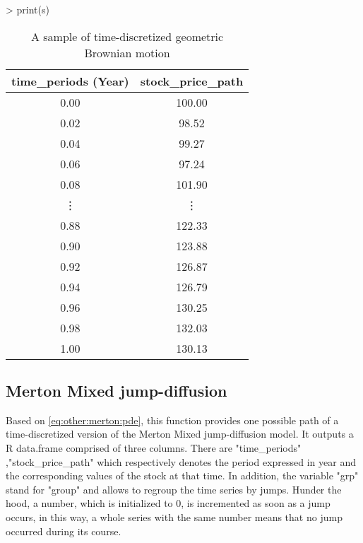 \documentclass[12pt]{report}
\begin{document}
\begin{appendices}
\begin{Schunk}
\begin{Sinput}
> print(s)
\end{Sinput}
\end{Schunk}

\begin{table}[H]
\begin{tabular}{cc}
  \hline
 time\_periods (Year) & stock\_price\_path \\ 
  \hline
 0.00 & 100.00 \\ 
 0.02 & 98.52 \\ 
 0.04 & 99.27 \\ 
 0.06 & 97.24 \\ 
 0.08 & 101.90 \\ 
 \vdots & \vdots \\
 0.88 & 122.33 \\ 
 0.90 & 123.88 \\ 
 0.92 & 126.87 \\ 
 0.94 & 126.79 \\ 
 0.96 & 130.25 \\ 
 0.98 & 132.03 \\ 
 1.00 & 130.13 \\ 
   \hline
\end{tabular}
\caption{A sample of time-discretized geometric Brownian motion}
\end{table}





\subsection{Merton Mixed jump-diffusion}
\label{sub:r:time:merton}

Based on \cref{eq:other:merton:pde}, this function provides one possible path of a time-discretized version of the Merton Mixed jump-diffusion model.
It outputs a R data.frame comprised of three columns. 
There are "time\_periods" ,"stock\_price\_path" which respectively denotes the period expressed in year and the corresponding values of the stock at that time.
In addition, the variable "grp" stand for "group" and allows to regroup the time series by jumps. Hunder the hood, a number, which is initialized to 0, is incremented as soon as a jump occurs, in this way, a whole series with the same number means that no jump occurred during its course.


\end{appendices}
\end{document}
